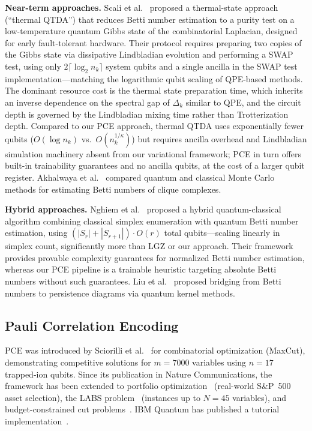 \documentclass[conference,10pt]{IEEEtran}
\begin{document}
\textbf{Near-term approaches.} Scali et al.~\cite{Scali24} proposed a
thermal-state approach (``thermal QTDA'') that reduces Betti number
estimation to a purity test on a low-temperature quantum Gibbs state
of the combinatorial Laplacian, designed for early fault-tolerant
hardware. Their protocol requires preparing two copies of the Gibbs
state via dissipative Lindbladian evolution and performing a SWAP
test, using only $2\lceil\log_2 n_k\rceil$ system qubits and a single
ancilla in the SWAP test implementation---matching the logarithmic qubit scaling of QPE-based methods.
The dominant resource cost is the thermal state preparation time,
which inherits an inverse dependence on the spectral gap of $\Delta_k$
similar to QPE, and the circuit depth is governed by the Lindbladian
mixing time rather than Trotterization depth. Compared to our PCE
approach, thermal QTDA uses exponentially fewer qubits
($O(\log n_k)$ vs.\ $O(n_k^{1/\kappa})$) but requires ancilla overhead
and Lindbladian simulation machinery absent from our variational
framework; PCE in turn offers built-in trainability guarantees and no
ancilla qubits, at the cost of a larger qubit register. Akhalwaya et
al.~\cite{Akhalwaya22} compared quantum and classical Monte Carlo
methods for estimating Betti numbers of clique complexes.

\textbf{Hybrid approaches.} Nghiem et al.~\cite{Nghiem25} proposed a
hybrid quantum-classical algorithm combining classical simplex
enumeration with quantum Betti number estimation, using
$(|S_r| + |S_{r+1}|) \cdot O(r)$ total qubits---scaling linearly in
simplex count, significantly more than LGZ or our approach. Their
framework provides provable complexity guarantees for normalized Betti
number estimation, whereas our PCE pipeline is a trainable heuristic
targeting absolute Betti numbers without such guarantees. Liu et
al.~\cite{Liu25} proposed bridging from Betti numbers to persistence
diagrams via quantum kernel methods.

\subsection{Pauli Correlation Encoding}

PCE was introduced by Sciorilli et al.~\cite{Sciorilli24} for
combinatorial optimization (MaxCut), demonstrating competitive
solutions for $m = 7000$ variables using $n = 17$ trapped-ion qubits.
Since its publication in Nature Communications, the framework has been
extended to portfolio optimization~\cite{PCEportfolio25} (real-world
S\&P~500 asset selection), the LABS problem~\cite{PCElabs25} (instances up to $N = 45$
variables), and budget-constrained cut
problems~\cite{PCEbudget25}. IBM Quantum has published a tutorial
implementation~\cite{IBMpce}.
\end{document}
